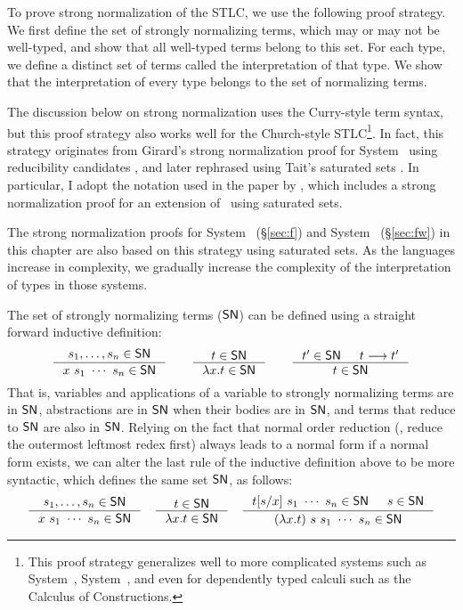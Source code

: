 To prove strong normalization of the STLC, we use the following proof strategy.
We first define the set of strongly normalizing terms, which may or may not be
well-typed, and show that all well-typed terms belong to this set.
For each type, we define a distinct set of terms called the interpretation
of that type. We show that the interpretation of every type
belongs to the set of normalizing terms.

The discussion below on strong normalization uses the
Curry-style term syntax, but this proof strategy also works well
for the Church-style STLC\footnote{This proof strategy generalizes well
        to more complicated systems such as System~\F, System~\Fw, and
        even for dependently typed calculi such as
        the Calculus of Constructions\cite{Geuvers94}.}.
In fact, this strategy originates from Girard's strong normalization proof
for System \F\ using reducibility candidates \cite{Gir71}, and later rephrased
using Tait's saturated sets \cite{Tait75}. In particular, I adopt
the notation used in the paper by \citet{AbeMat04}, which includes
a strong normalization proof for an extension of \Fw\ using saturated sets.

The strong normalization proofs for System \F\ (\S\ref{sec:f}) and
System \Fw\ (\S\ref{sec:fw}) in this chapter 
are also based on this strategy using saturated sets. As the languages
increase in complexity, we gradually
increase the complexity of the interpretation of types in those systems.

The set of strongly normalizing terms ($\mathsf{SN}$) can be defined
using a straight forward inductive definition:
\[
\inference{s_1,\ldots,s_n\in\SN}{x~s_1~\cdots~s_n \in \SN}
\qquad
\inference{t \in \SN}{\l x.t \in \SN}
\qquad
\inference{t' \in \SN & t --> t'}{t \in \SN}
\]
That is, variables and applications of a variable to strongly normalizing terms
are in $\mathsf{SN}$, abstractions are in $\mathsf{SN}$ when their bodies are in $\mathsf{SN}$,
and terms that reduce to $\mathsf{SN}$ are also in $\mathsf{SN}$. Relying on the fact that
normal order reduction (\ie, reduce the outermost leftmost redex first) always
leads to a normal form if a normal form exists, we can alter the last rule of
the inductive definition above to be more syntactic, which defines the same set
$\mathsf{SN}$, as follows:
\[
\inference{s_1,\ldots,s_n\in\SN}{x~s_1~\cdots~s_n \in \SN}
\quad
\inference{t \in \SN}{\l x.t \in \SN}
\quad
\inference{t[s/x]~s_1~\cdots~s_n\in \SN & s\in\SN}
        {(\lambda x.t)~s~s_1~\cdots~s_n \in \SN}
\]

